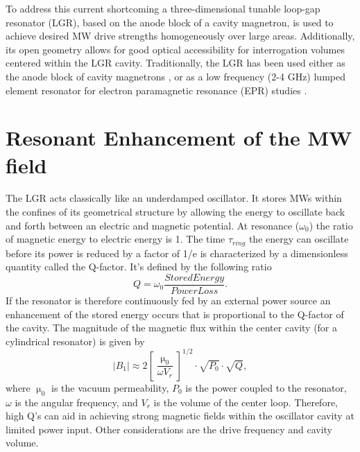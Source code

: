 To address this current shortcoming a three-dimensional tunable loop-gap resonator (LGR), based on the anode block of a cavity magnetron, is used to achieve desired MW drive strengths homogeneously over large areas. Additionally, its open geometry allows for good optical accessibility for interrogation volumes centered within the LGR cavity. Traditionally, the LGR has been used either as the anode block of cavity magnetrons \cite{collins1948microwave}, or as a low frequency (2-4 GHz) lumped element resonator for electron paramagnetic resonance (EPR) studies \cite{rinard2005loopgap}.  

\section{Resonant Enhancement of the MW field}\label{resonant_enhc}

The LGR acts classically like an underdamped oscillator. It stores MWs within the confines of its geometrical structure by allowing the energy to oscillate back and forth between an electric and magnetic potential. At resonance ($\omega_0$) the ratio of magnetic energy to electric energy is 1. The time $\tau_{ring}$ the energy can oscillate before its power is reduced by a factor of 1/e is characterized by a dimensionless quantity called the Q-factor. It's defined by the following ratio
\begin{equation}
Q = \omega_0 \frac{Stored Energy}{Power Loss}.
\end{equation}
If the resonator is therefore continuously fed by an external power source an enhancement of the stored energy occurs that is proportional to the Q-factor of the cavity. The magnitude of the magnetic flux within the center cavity (for a cylindrical resonator) is given by
\begin{equation} \label{B1approx}
|B_1| \approx  2\left[\frac{\upmu_0}{\omega V_r}\right]^{1/2} \cdot \sqrt{P_0} \cdot \sqrt{Q},
\end{equation}
where $\upmu_0$ is the vacuum permeability, $P_0$ is the power coupled to the resonator, $\omega$ is the angular frequency, and $V_r$ is the volume of the center loop. Therefore, high Q's can aid in achieving strong magnetic fields within the oscillator cavity at limited power input. Other considerations are the drive frequency and cavity volume.



